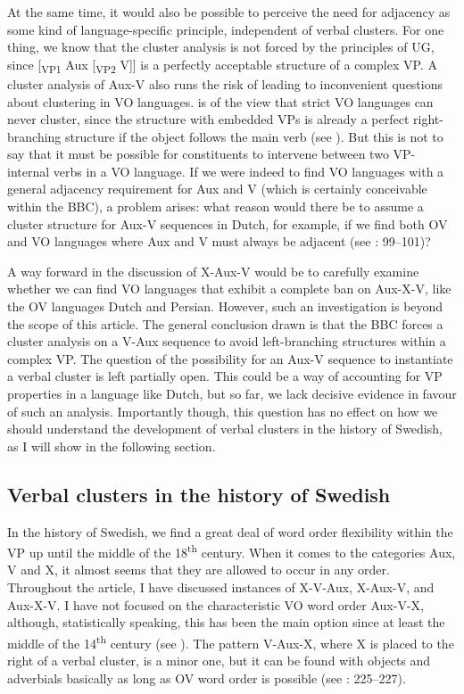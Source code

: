 \documentclass[output=paper, colorlinks, citecolor=brown]{langscibook}
\begin{document}
At the same time, it would also be possible to perceive the need for adjacency as some kind of language-specific principle, independent of verbal clusters. For one thing, we know that the cluster analysis is not forced by the principles of UG, since [\textsubscript{VP1} Aux [\textsubscript{VP2} V]] is a perfectly acceptable structure of a complex VP. A cluster analysis of Aux-V also runs the risk of leading to inconvenient questions about clustering in VO languages. \citet[343]{Haider2010} is of the view that strict VO languages can never cluster, since the structure with embedded VPs is already a perfect right-branching structure if the object follows the main verb (see ). But this is not to say that it must be possible for constituents to intervene between two VP-internal verbs in a VO language. If we were indeed to find VO languages with a general adjacency requirement for Aux and V (which is certainly conceivable within the BBC), a problem arises: what reason would there be to assume a cluster structure for Aux-V sequences in Dutch, for example, if we find both OV and VO languages where Aux and V must always be adjacent (see \citealt{Sheehan2017Final}: 99–101)?



A way forward in the discussion of X-Aux-V would be to carefully examine whether we can find VO languages that exhibit a complete ban on Aux-X-V, like the OV languages Dutch and Persian. However, such an investigation is beyond the scope of this article. The general conclusion drawn is that the BBC forces a cluster analysis on a V-Aux sequence to avoid left-branching structures within a complex VP. The question of the possibility for an Aux-V sequence to instantiate a verbal cluster is left partially open. This could be a way of accounting for VP properties in a language like Dutch, but so far, we lack decisive evidence in favour of such an analysis. Importantly though, this question has no effect on how we should understand the development of verbal clusters in the history of Swedish, as I will show in the following section.


\subsection{Verbal clusters in the history of Swedish}\label{sec:sangfelt:5.3}

In the history of Swedish, we find a great deal of word order flexibility within the VP up until the middle of the 18\textsuperscript{th} century. When it comes to the categories Aux, V and X, it almost seems that they are allowed to occur in any order. Throughout the article, I have discussed instances of X-V-Aux, X-Aux-V, and Aux-X-V. I have not focused on the characteristic VO word order Aux-V-X, although, statistically speaking, this has been the main option since at least the middle of the 14\textsuperscript{th} century (see \citealt{Delsing1999,Petzell2011,Sangfelt2019}). The pattern V-Aux-X, where X is placed to the right of a verbal cluster, is a minor one, but it can be found with objects and adverbials basically as long as OV word order is possible (see \citealt{Sangfelt2019}: 225–227).
\end{document}
